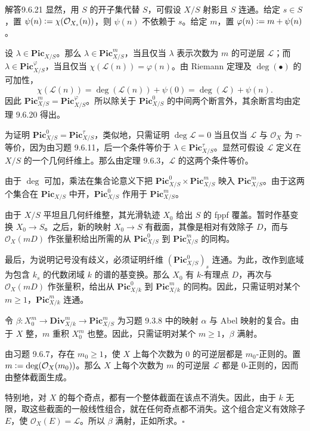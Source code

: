 \begin{origstatement}{解答}{9.6.21}\label{appA:ans9621}
显然，用 $S$ 的开子集代替 $S$，可假设 $X/S$ 射影且 $S$ 连通。给定 $s\in S$，置 $\psi(n)\mathrel{\mathop:}=\chi(\mathcal O_{X_s}(n))$，则 $\psi(n)$ 不依赖于 $s$。给定 $m$，置 $\varphi(n)\mathrel{\mathop:}= m+\psi(n)$。

设 $\lambda\in\mathbf{Pic}_{X/S}$。那么 $\lambda\in\mathbf{Pic}_{X/S}^m$，当且仅当 $\lambda$ 表示次数为 $m$ 的可逆层 $\mathcal L$；而 $\lambda\in\mathbf{Pic}_{X/S}^{\varphi}$，当且仅当 $\chi(\mathcal L(n))=\varphi(n)$。由 Riemann 定理及 $\deg(\bullet)$ 的可加性，
\[
 \chi(\mathcal L(n))=\deg(\mathcal L(n))+\psi(0)=\deg(\mathcal L)+\psi(n).
\]
因此 $\mathbf{Pic}_{X/S}^m=\mathbf{Pic}_{X/S}^{\varphi}$。所以除关于 $\mathbf{Pic}_{X/S}^0$ 的中间两个断言外，其余断言均由定理 9.6.20 得出。

为证明 $\mathbf{Pic}_{X/S}^0=\mathbf{Pic}_{X/S}^{\tau}$，类似地，只需证明 $\deg\mathcal L=0$ 当且仅当 $\mathcal L$ 与 $\mathcal O_X$ 为 $\tau$-等价，因为由习题 9.6.11，后一个条件等价于 $\lambda\in\mathbf{Pic}_{X/S}^{\tau}$。显然可假设 $\mathcal L$ 定义在 $X/S$ 的一个几何纤维上。那么由定理 9.6.3，$\mathcal L$ 的这两个条件等价。

由于 $\deg$ 可加，乘法在集合论意义下把 $\mathbf{Pic}_{X/S}^0\times\mathbf{Pic}_{X/S}^m$ 映入 $\mathbf{Pic}_{X/S}^m$。由于这两个集合在 $\mathbf{Pic}_{X/S}$ 中开，$\mathbf{Pic}_{X/S}^0$ 作用于 $\mathbf{Pic}_{X/S}^m$。

由于 $X/S$ 平坦且几何纤维整，其光滑轨迹 $X_0$ 给出 $S$ 的 fppf 覆盖。暂时作基变换 $X_0\to S$。之后，新的映射 $X_0\to S$ 有截面，其像是相对有效除子 $D$，而与 $\mathcal O_X(mD)$ 作张量积给出所需的从 $\mathbf{Pic}_{X/S}^0$ 到 $\mathbf{Pic}_{X/S}^m$ 的同构。

最后，为说明记号没有歧义，必须证明纤维 $(\mathbf{Pic}_{X/S}^0)_s$ 连通。为此，改作到底域为包含 $k_s$ 的代数闭域 $k$ 的谱的基变换。那么 $X_0$ 有 $k$-有理点 $D$，再次与 $\mathcal O_X(mD)$ 作张量积，给出从 $\mathbf{Pic}_{X/k}^0$ 到 $\mathbf{Pic}_{X/k}^m$ 的同构。因此，只需证明对某个 $m\geq1$，$\mathbf{Pic}_{X/k}^m$ 连通。

令 $\beta\colon X_0^m\to\mathbf{Div}_{X/k}^m\to\mathbf{Pic}_{X/S}^m$ 为习题 9.3.8 中的映射 $\alpha$ 与 Abel 映射的复合。由于 $X$ 整，$m$ 重积 $X_0^m$ 也整。因此，只需证明对某个 $m\geq1$，$\beta$ 满射。

由习题 9.6.7，存在 $m_0\geq1$，使 $X$ 上每个次数为 $0$ 的可逆层都是 $m_0$-正则的。置 $m\mathrel{\mathop:}=\deg(\mathcal O_X(m_0))$。那么 $X$ 上每个次数为 $m$ 的可逆层 $\mathcal L$ 都是 $0$-正则的，因而由整体截面生成。

特别地，对 $X$ 的每个奇点，都有一个整体截面在该点不消失。因此，由于 $k$ 无限，取这些截面的一般线性组合，就在任何奇点都不消失。这个组合定义有效除子 $E$，使 $\mathcal O_X(E)=\mathcal L$。所以 $\beta$ 满射，正如所求。\hfill$\square$
\end{origstatement}

